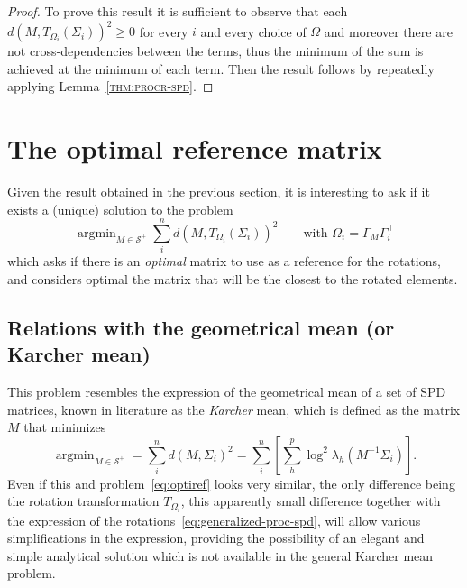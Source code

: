 \documentclass[fleqn]{article}
\theoremstyle{theorem}
\theoremstyle{definition}
\newcommand{\lemmaref}[1]{Lemma~\textsc{\ref{#1}}}
\DeclareMathOperator*{\argmin}{argmin}
\begin{document}
    \begin{proof}
        To prove this result it is sufficient to observe that each $d(M, T_{\Omega_i}(\Sigma_i))^2\geq 0$ for every $i$ and every choice of $\Omega$ and moreover there are not cross-dependencies between the terms, thus the minimum of the sum is achieved at the minimum of each term. Then the result follows by repeatedly applying \lemmaref{thm:procr-spd}.
    \end{proof}

    \section{The optimal reference matrix}
    Given the result obtained in the previous section, it is interesting to ask if it exists a (unique) solution to the problem
    \begin{equation}\label{eq:optiref}
        \argmin_{M\in\mathcal{S}^+} \sum_i^nd\left(M, T_{\Omega_i}(\Sigma_i)\right)^2 \qquad \text{with } \Omega_i = \Gamma_M\Gamma_i^\top
    \end{equation}
    which asks if there is an \emph{optimal} matrix to use as a reference for the rotations, and considers optimal the matrix that will be the closest to the rotated elements.

    \subsection{Relations with the geometrical mean (or Karcher mean)}
    This problem resembles the expression of the geometrical mean of a set of SPD matrices, known in literature as the \emph{Karcher} mean, which is defined as the matrix $M$ that minimizes
    \begin{equation*}
        \argmin_{M\in\mathcal{S}^+} = \sum_i^nd\left(M, \Sigma_i\right)^2 = \sum_i^n\left[\sum_h^p\log^2\lambda_h\left(M^{-1}\Sigma_i\right)\right].
    \end{equation*}
    Even if this and problem~\eqref{eq:optiref} looks very similar, the only difference being the rotation transformation $T_{\Omega_i}$, this apparently small difference together with the expression of the rotations~\eqref{eq:generalized-proc-spd}, will allow various simplifications in the expression, providing the possibility of an elegant and simple analytical solution which is not available in the general Karcher mean problem.
\end{document}
